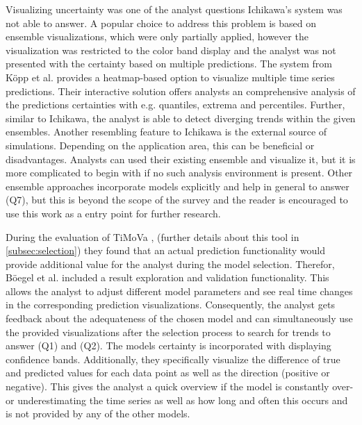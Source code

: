 \documentclass[electronic]{vgtc}             %
\begin{document}
Visualizing uncertainty was one of the analyst questions Ichikawa's \cite{ichikawa:2002} system was not able to answer.
A popular choice to address this problem is based on ensemble visualizations, which were only partially applied, however the visualization was restricted to the color band display and the analyst was not presented with the certainty based on multiple predictions. 
The system from K\"opp et al. \cite{koepp:2014} provides a heatmap-based option to visualize multiple time series predictions. 
Their interactive solution offers analysts an comprehensive analysis of the predictions certainties with e.g. quantiles, extrema and percentiles. 
Further, similar to Ichikawa, the analyst is able to detect diverging trends within the given ensembles. 
Another resembling feature to Ichikawa is the external source of simulations. 
Depending on the application area, this can be beneficial or disadvantages. 
Analysts can used their existing ensemble and visualize it, but it is more complicated to begin with if no such analysis environment is present. 
Other ensemble approaches incorporate models explicitly and help in general to answer (Q7), but this is beyond the scope of the survey and the reader is encouraged to use this work as a entry point for further research. 

During the evaluation of TiMoVa \cite{boegl:2013}, (further details about this tool in \autoref{subsec:selection}) they found that an actual prediction functionality would provide additional value for the analyst during the model selection.
Therefor, B\"oegel et al. \cite{boegl:2014} included a result exploration and validation functionality.
This allows the analyst to adjust different model parameters and see real time changes in the corresponding prediction visualizations.
Consequently, the analyst gets feedback about the adequateness of the chosen model and can simultaneously use the provided visualizations after the selection process to search for trends to answer (Q1) and (Q2).
The models certainty is incorporated with displaying confidence bands.
Additionally, they specifically visualize the difference of true and predicted values for each data point as well as the direction (positive or negative).
This gives the analyst a quick overview if the model is constantly over- or underestimating the time series as well as how long and often this occurs and is not provided by any of the other models.
\end{document}
